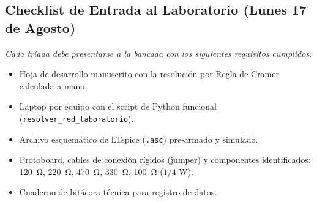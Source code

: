 \documentclass[11pt, a4paper]{article}
\begin{document}
\begin{landscape}
\section{Checklist de Entrada al Laboratorio (Lunes 17 de Agosto)}
\textit{Cada tríada debe presentarse a la bancada con los siguientes requisitos cumplidos:}

\begin{itemize}[label=\Large $\square$, itemsep=6pt]
    \item Hoja de desarrollo manuscrito con la resolución por Regla de Cramer calculada a mano.
    \item Laptop por equipo con el script de Python funcional (\texttt{resolver\_red\_laboratorio}).
    \item Archivo esquemático de LTspice (\texttt{.asc}) pre-armado y simulado.
    \item Protoboard, cables de conexión rígidos (jumper) y componentes identificados: \qty{120}{\ohm}, \qty{220}{\ohm}, \qty{470}{\ohm}, \qty{330}{\ohm}, \qty{100}{\ohm} ($1/4\text{ W}$).
    \item Cuaderno de bitácora técnica para registro de datos.
\end{itemize}
\end{landscape}
\end{document}

